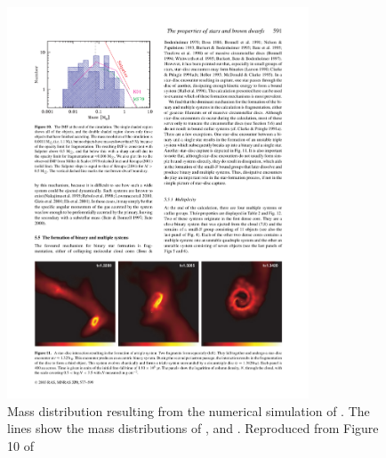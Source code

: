 \begin{figure}[htbp]
\begin{center}
\includegraphics[width=0.8\textwidth]{background/Figures/F10_Bate2003.pdf}
\caption{Mass distribution resulting from the numerical simulation of \citet{2003MNRAS.339..577B}. The lines show the mass distributions of \citet{Salpeter1955}, \citet{1979ApJS...41..513M} and \citet{2001MNRAS.322..231K}. Reproduced from Figure 10 of \citet{2003MNRAS.339..577B}}
\label{fig:IMFBate2003}
\end{center}
\end{figure}

